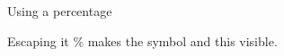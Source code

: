 \documentclass{report}
\begin{document}
Using a percentage %

Escaping it \% makes the symbol and this visible.
\end{document}
